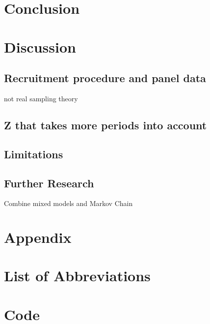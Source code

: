 \documentclass[12pt,a4paper,oneside]{book}
\begin{document}
\chapter{Conclusion}


\chapter{Discussion}

\section*{Recruitment procedure and panel data}
not real sampling theory



\section*{Z that takes more periods into account}



\section*{Limitations}


\section*{Further Research}

Combine mixed models and Markov Chain \citep{de_haan-rietdijk_use_2017} 





\newpage

\chapter*{Appendix}




\chapter*{List of Abbreviations}

\begin{appendix}
  \listoffigures
  \listoftables
\end{appendix}

\chapter*{Code}
\end{document}

